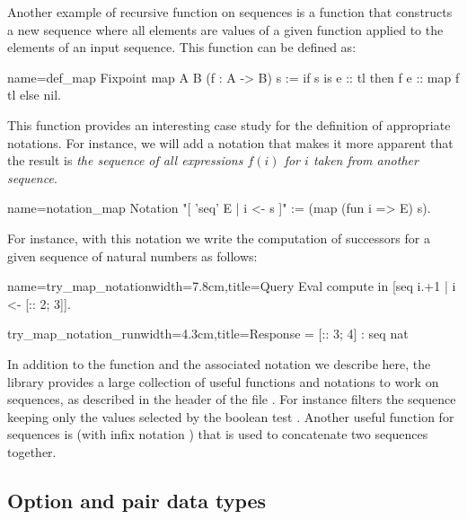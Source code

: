 Another example of recursive function on sequences is a function that constructs
a new sequence where all elements are values of a given function applied to
the elements of an input sequence.  This function can be defined as:

\begin{coq}{name=def_map}{}
Fixpoint map A B (f : A -> B) s :=
  if s is e :: tl then f e :: map f tl else nil.
\end{coq}
This function provides an interesting case study for the definition of
appropriate notations. For instance, we will add a notation that
makes it more apparent that the result is {\em the sequence of all
expressions \(f(i)\) for \(i\) taken from another sequence}.

\begin{coq}{name=notation_map}{}
Notation "[ 'seq' E | i <- s ]" := (map (fun i => E) s).
\end{coq}
For instance, with this notation we write the computation of successors
for a given sequence of natural numbers as follows:

\begin{coq}{name=try_map_notation}{width=7.8cm,title=Query}
Eval compute in [seq i.+1 | i <- [:: 2; 3]].
\end{coq}
\begin{coqout}{try_map_notation_run}{width=4.3cm,title=Response}
= [:: 3; 4] : seq nat
\end{coqout}
\index[coq]{\C{[seq .. "| .. <- ..]}}
In addition to the function  and the associated notation
we describe here, the \mcbMC{} library
provides a large collection of useful functions and notations to work on
sequences, as described in the header of the file .  For
instance \C{[seq i <- s | p]} filters the sequence  keeping only
the values selected by the boolean test .
Another useful function for sequences is  (with infix notation \C{++})
that is used to concatenate two sequences together.
\index[coq]{\C{(_ ++ _)}}
\index[coq]{\C{[seq .. <- .. "| ..]}}

\subsection{Option and pair data types}\label{sec:othercontainers}

